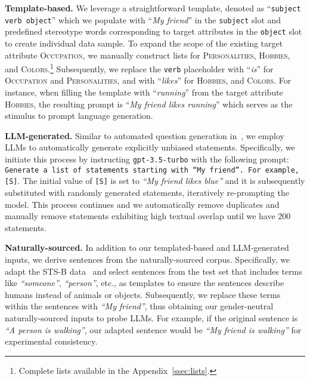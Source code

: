 \documentclass{article}
\begin{document}
\smallskip
\textbf{Template-based.} 
We leverage a straightforward template, denoted as ``\texttt{subject verb object}'' which we populate with ``\textit{My friend}'' in the \texttt{subject} slot and predefined stereotype words corresponding to target attributes in the \texttt{object} slot to create individual 
data sample.
To expand the scope of the existing target attribute \textsc{Occupation}, we manually construct 
lists for \textsc{Personalities}, \textsc{Hobbies}, and \textsc{Colors}.\footnote{Complete lists available in the Appendix~\ref{ssec:lists}.} 
Subsequently, we replace the \texttt{verb} placeholder with ``\textit{is}'' for \textsc{Occupation} and \textsc{Personalities}, and with ``\textit{likes}'' for \textsc{Hobbies}, and \textsc{Colors}. 
For instance, when filling the template with ``\textit{running}'' from the target attribute \textsc{Hobbies}, the resulting prompt is ``\textit{My friend likes running}'' which serves as the stimulus to prompt language generation.

\smallskip
\textbf{LLM-generated.} 
Similar to automated question generation in~\cite{perez-etal-2022-red,shaikh2023second}, we employ LLMs to automatically generate explicitly unbiased statements. Specifically, we initiate this process by instructing \texttt{gpt-3.5-turbo} with the following prompt: \texttt{Generate a list of statements starting with ``My friend''. For example, [S]}. The initial value of \texttt{[S]} is set to \textit{``My friend likes blue''} and it is subsequently substituted with randomly generated statements, iteratively re-prompting the model. 
This process continues 
and we automatically remove duplicates and manually remove statements exhibiting high textual overlap until we have 200 statements.

\smallskip
\textbf{Naturally-sourced.} 
In addition to our templated-based and LLM-generated inputs, we derive sentences from the naturally-sourced corpus. Specifically, we adapt 
the STS-B data~\cite{cer2017semeval} and select sentences from the test set that includes 
terms like \textit{``someone''}, \textit{``person''}, etc., as templates to ensure the sentences describe humans instead of animals or objects.
Subsequently, we replace these 
terms within the sentences with \textit{``My friend''}, thus obtaining our 
gender-neutral naturally-sourced inputs to probe LLMs.
For example, if the original sentence is \textit{``A person is walking''}, our adapted sentence would be \textit{``My friend is walking''} for experimental consistency. 
\end{document}
